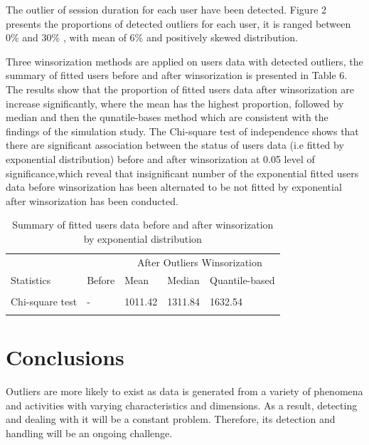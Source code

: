 \documentclass[notitlepage,12pt]{jedm}
\begin{document}
The outlier of session duration for each user have been detected. Figure
2 presents the proportions of detected outliers for each user, it is
ranged between 0\% and 30\% , with mean of 6\% and positively skewed
distribution.

Three winsorization methods are applied on users data with detected
outliers, the summary of fitted users before and after winsorization is
presented in Table 6. The results show that the proportion of fitted
users data after winsorization are increase significantly, where the
mean has the highest proportion, followed by median and then the
qunatile-bases method which are consistent with the findings of the
simulation study. The Chi-square test of independence shows that there
are significant association between the status of users data (i.e fitted
by exponential distribution) before and after winsorization at 0.05
level of significance,which reveal that insignificant number of the
exponential fitted users data before winsorization has been alternated
to be not fitted by exponential after winsorization has been conducted.

\begin{table}[H]

\caption{\label{tab:unnamed-chunk-9}Summary of fitted users data before and after winsorization by exponential distribution}
\centering
\begin{tabular}[t]{l|l|l|l|l}
\hline
\multicolumn{1}{c|}{ } & \multicolumn{1}{c|}{ } & \multicolumn{3}{c}{After Outliers Winsorization} \\
\cline{3-5}
Statistics & Before & Mean & Median & Quantile-based\\
\hline
\cellcolor{gray!6}{Proportion of fit} & \cellcolor{gray!6}{0.31} & \cellcolor{gray!6}{0.67} & \cellcolor{gray!6}{0.61} & \cellcolor{gray!6}{0.56}\\
\hline
Chi-square test & - & 1011.42 & 1311.84 & 1632.54\\
\hline
\cellcolor{gray!6}{p-value} & \cellcolor{gray!6}{-} & \cellcolor{gray!6}{0} & \cellcolor{gray!6}{0} & \cellcolor{gray!6}{0}\\
\hline
\end{tabular}
\end{table}

\hypertarget{conclusions}{%
\section{Conclusions}\label{conclusions}}

Outliers are more likely to exist as data is generated from a variety of
phenomena and activities with varying characteristics and dimensions. As
a result, detecting and dealing with it will be a constant problem.
Therefore, its detection and handling will be an ongoing challenge.
\end{document}
